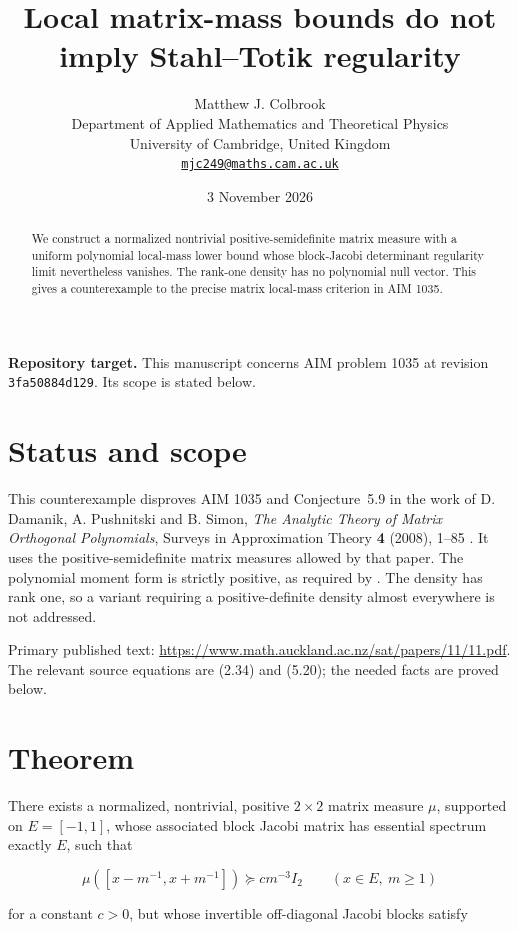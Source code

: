 \documentclass[11pt,a4paper]{article}
\title{\textbf{Local matrix-mass bounds do not imply Stahl--Totik regularity}}
\author{Matthew J. Colbrook\\[3pt]
{\small Department of Applied Mathematics and Theoretical Physics}\\
{\small University of Cambridge, United Kingdom}\\
{\small\href{mailto:mjc249@maths.cam.ac.uk}{\texttt{mjc249@maths.cam.ac.uk}}}}
\date{3 November 2026}
\begin{document}
\maketitle
\begin{abstract}
We construct a normalized nontrivial positive-semidefinite matrix measure with a uniform polynomial local-mass lower bound whose block-Jacobi determinant regularity limit nevertheless vanishes. The rank-one density has no polynomial null vector. This gives a counterexample to the precise matrix local-mass criterion in AIM 1035.
\end{abstract}
\noindent\textbf{Repository target.}
This manuscript concerns AIM problem 1035 at revision
\texttt{3fa50884d129}. Its scope is stated below.
\medskip

\hypertarget{1035-status-and-scope}{%
\section{Status and scope}\label{1035-status-and-scope}}

This counterexample disproves AIM 1035 and Conjecture~5.9 in the work of D. Damanik,
A. Pushnitski and B. Simon, \emph{The Analytic Theory of Matrix
Orthogonal Polynomials}, Surveys in Approximation Theory \textbf{4}
(2008), 1--85 \cite{DPS08}. It uses the positive-semidefinite matrix measures allowed
by that paper. The polynomial moment form is strictly positive, as
required by \cite[Section~1.2 and Lemma~2.1]{DPS08}. The density has rank one, so a variant requiring
a positive-definite density almost everywhere is not addressed.

Primary published text:
\url{https://www.math.auckland.ac.nz/sat/papers/11/11.pdf}. The
relevant source equations are (2.34) and (5.20); the needed facts are
proved below.

\hypertarget{1035-theorem}{%
\section{Theorem}\label{1035-theorem}}

There exists a normalized, nontrivial, positive \(2\times2\) matrix
measure \(\mu\), supported on \(E=[-1,1]\), whose associated block
Jacobi matrix has essential spectrum exactly \(E\), such that

\[
\mu([x-m^{-1},x+m^{-1}])\succeq c m^{-3} I_2
\qquad(x\in E,\ m\ge1)
\]

for a constant \(c>0\), but whose invertible off-diagonal Jacobi blocks
satisfy
\end{document}
